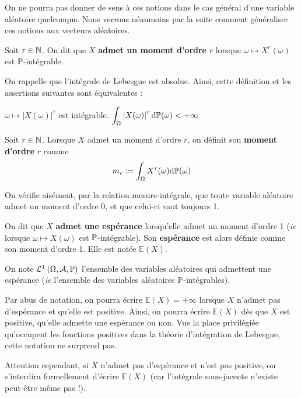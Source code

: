 \documentclass[../integ-proba.tex]{subfiles}
\begin{document}
    On ne pourra pas donner de sens à ces notions dans le cas général d'une variable aléatoire quelconque.
    Nous verrons néanmoins par la suite comment généraliser ces notions aux vecteurs aléatoires.

    \begin{defi}
        Soit $r\in\mathbb{N}$.
        On dit que $X$ \textbf{admet un moment d'ordre} $r$ lorsque $\omega \mapsto X^r(\omega)$ est $\mathbb{P}$-intégrable.
    \end{defi}

    \begin{rem}
        On rappelle que l'intégrale de Lebesgue est absolue.
        Ainsi, cette définition et les assertions suivantes sont équivalentes :
        \begin{itemize}
            \itemb $\omega \mapsto \left|X(\omega)\right|^r$ est intégrable.
            \itemb $\displaystyle \int_\Omega\left|X(\omega)\right|^r\text{d}\mathbb{P}(\omega) < +\infty$
        \end{itemize}
    \end{rem}

    \begin{defi}
        Soit $r\in\mathbb{N}$.
        Lorsque $X$ admet un moment d'ordre $r$, on définit son \textbf{moment d'ordre } $r$ comme
        \begin{displaymath}
          m_r \coloneqq \int_\Omega X^r(\omega)\text{d}\mathbb{P}(\omega)
        \end{displaymath}
    \end{defi}

    \begin{rem}
        On vérifie aisément, par la relation mesure-intégrale, que toute variable aléatoire admet un moment d'ordre 0, et que celui-ci vaut toujours 1.
    \end{rem}

    \begin{defi}
        On dit que $X$ \textbf{admet une espérance} lorsqu'elle admet un moment d'ordre 1 (\textit{ie} lorsque $\omega \mapsto X\left(\omega\right)$ est $\mathbb{P}$-intégrable).
        Son \textbf{espérance} est alors définie comme son moment d'ordre 1.
        Elle est notée $\mathbb{E}(X)$.

        On note $\mathcal{L}^1\left(\Omega, \mathcal{A}, \mathbb{P}\right)$ l'ensemble des variables aléatoires qui admettent une espérance (\textit{ie} l'ensemble des variables aléatoires $\mathbb{P}$-intégrables).
    \end{defi}

    \begin{rem}
        Par abus de notation, on pourra écrire $\mathbb{E}(X)=+\infty$ lorsque $X$ n'admet pas d'espérance et qu'elle est positive.
        Ainsi, on pourra écrire $\mathbb{E}(X)$ dès que $X$ est positive, qu'elle admette une espérance ou non.
        Vue la place privilégiée qu'occupent les fonctions positives dans la théorie d'intégration de Lebesgue, cette notation ne surprend pas.

        Attention cependant, si $X$ n'admet pas d'espérance et n'est pas positive, on s'interdira formellement d'écrire $\mathbb{E}(X)$ (car l'intégrale sous-jacente n'existe peut-être même pas !).
    \end{rem}
\end{document}

